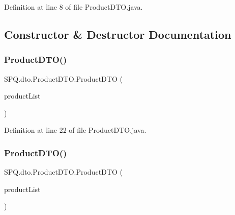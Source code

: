 Definition at line 8 of file Product\+D\+T\+O.\+java.



\subsection{Constructor \& Destructor Documentation}
\mbox{\label{class_s_p_q_1_1dto_1_1_product_d_t_o_a206290d64e728a8838485f958bee2c29}} 
\subsubsection{\texorpdfstring{Product\+D\+T\+O()}{ProductDTO()}\hspace{0.1cm}{\footnotesize\ttfamily [1/2]}}
{\footnotesize\ttfamily S\+P\+Q.\+dto.\+Product\+D\+T\+O.\+Product\+D\+TO (\begin{DoxyParamCaption}\item[{Array\+List$<$ \mbox{\hyperlink{class_s_p_q_1_1data_1_1_product}{Product}} $>$}]{product\+List }\end{DoxyParamCaption})}



Definition at line 22 of file Product\+D\+T\+O.\+java.

\mbox{\label{class_s_p_q_1_1dto_1_1_product_d_t_o_a206290d64e728a8838485f958bee2c29}} 
\subsubsection{\texorpdfstring{Product\+D\+T\+O()}{ProductDTO()}\hspace{0.1cm}{\footnotesize\ttfamily [2/2]}}
{\footnotesize\ttfamily S\+P\+Q.\+dto.\+Product\+D\+T\+O.\+Product\+D\+TO (\begin{DoxyParamCaption}\item[{Array\+List$<$ \mbox{\hyperlink{class_s_p_q_1_1data_1_1_product}{Product}} $>$}]{product\+List }\end{DoxyParamCaption})}



